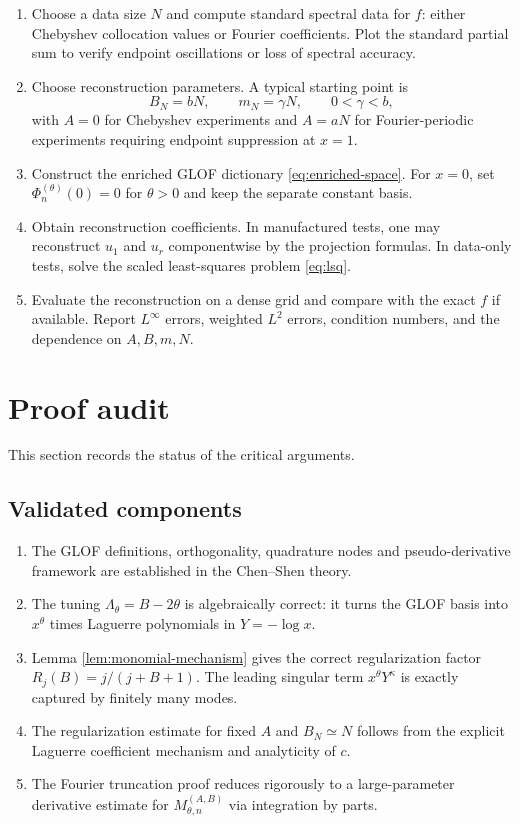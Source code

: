 \documentclass[11pt]{article}
\begin{document}
\begin{enumerate}[label=\textbf{Step \arabic*.},leftmargin=2.5em]
\item Choose a data size $N$ and compute standard spectral data for $f$: either Chebyshev collocation values or Fourier coefficients.  Plot the standard partial sum to verify endpoint oscillations or loss of spectral accuracy.
\item Choose reconstruction parameters.  A typical starting point is
\[
    B_N=bN,
    \qquad m_N=\gamma N,
    \qquad 0<\gamma<b,
\]
with $A=0$ for Chebyshev experiments and $A=aN$ for Fourier-periodic experiments requiring endpoint suppression at $x=1$.
\item Construct the enriched GLOF dictionary \eqref{eq:enriched-space}.  For $x=0$, set $\Phi_n^{(\theta)}(0)=0$ for $\theta>0$ and keep the separate constant basis.
\item Obtain reconstruction coefficients.  In manufactured tests, one may reconstruct $u_1$ and $u_r$ componentwise by the projection formulas.  In data-only tests, solve the scaled least-squares problem \eqref{eq:lsq}.
\item Evaluate the reconstruction on a dense grid and compare with the exact $f$ if available.  Report $L^\infty$ errors, weighted $L^2$ errors, condition numbers, and the dependence on $A,B,m,N$.
\end{enumerate}

\section{Proof audit}

This section records the status of the critical arguments.

\subsection*{Validated components}

\begin{enumerate}[label=(\roman*),leftmargin=2.5em]
\item The GLOF definitions, orthogonality, quadrature nodes and pseudo-derivative framework are established in the Chen--Shen theory.
\item The tuning $\Lambda_\theta=B-2\theta$ is algebraically correct: it turns the GLOF basis into $x^\theta$ times Laguerre polynomials in $Y=-\log x$.
\item Lemma \ref{lem:monomial-mechanism} gives the correct regularization factor $R_j(B)=j/(j+B+1)$.  The leading singular term $x^\theta Y^\kappa$ is exactly captured by finitely many modes.
\item The regularization estimate for fixed $A$ and $B_N\simeq N$ follows from the explicit Laguerre coefficient mechanism and analyticity of $c$.
\item The Fourier truncation proof reduces rigorously to a large-parameter derivative estimate for $M_{\theta,n}^{(A,B)}$ via integration by parts.
\end{enumerate}
\end{document}
